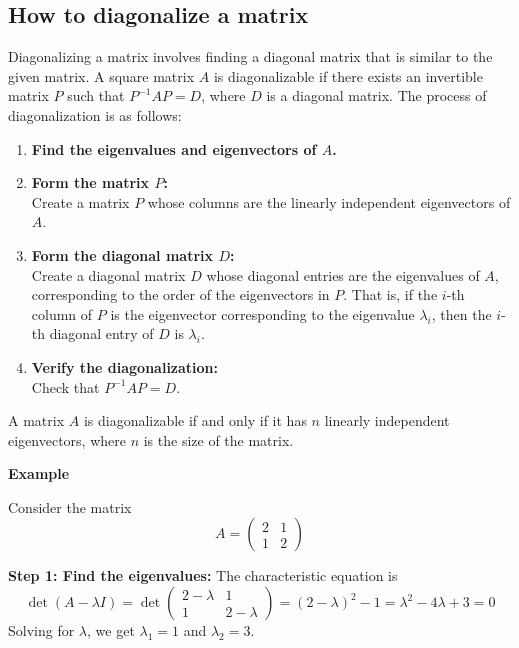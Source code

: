 \subsection{How to diagonalize a matrix}

Diagonalizing a matrix involves finding a diagonal matrix that is similar to the given matrix. A square matrix \(A\) is diagonalizable if there exists an invertible matrix \(P\) such that \(P^{-1}AP = D\), where \(D\) is a diagonal matrix.
The process of diagonalization is as follows:

\begin{enumerate}
    \item \textbf{Find the eigenvalues and eigenvectors of \(A\).}
    
    \item \textbf{Form the matrix \(P\):} \\
    Create a matrix \(P\) whose columns are the linearly independent eigenvectors of \(A\).
    
    \item \textbf{Form the diagonal matrix \(D\):} \\
    Create a diagonal matrix \(D\) whose diagonal entries are the eigenvalues of \(A\), corresponding to the order of the eigenvectors in \(P\). That is, if the \(i\)-th column of \(P\) is the eigenvector corresponding to the eigenvalue \(\lambda_i\), then the \(i\)-th diagonal entry of \(D\) is \(\lambda_i\).
    
    \item \textbf{Verify the diagonalization:} \\
    Check that \(P^{-1}AP = D\).
\end{enumerate}
  
A matrix \(A\) is diagonalizable if and only if it has \(n\) linearly independent eigenvectors, where \(n\) is the size of the matrix.
\vspace{\baselineskip}

\textbf{Example}
\vspace{\baselineskip}

Consider the matrix
\[
A = \begin{pmatrix}
2 & 1 \\
1 & 2
\end{pmatrix}
\]

\textbf{Step 1: Find the eigenvalues:}
    The characteristic equation is
    \[
    \det(A - \lambda I) = \det \begin{pmatrix}
    2 - \lambda & 1 \\
    1 & 2 - \lambda
    \end{pmatrix} = (2 - \lambda)^2 - 1 = \lambda^2 - 4\lambda + 3 = 0
    \]
    Solving for \(\lambda\), we get \(\lambda_1 = 1\) and \(\lambda_2 = 3\).

